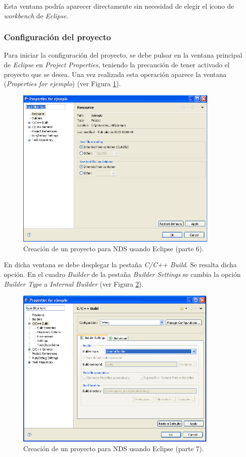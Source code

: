 Esta ventana podría aparecer directamente sin necesidad de elegir el icono de \textit{workbench} de \textit{Eclipse}.

\subsubsection{Configuración del proyecto}
Para iniciar la configuración del proyecto, se debe pulsar en la ventana principal de \textit{Eclipse} en \textit{Project Properties}, teniendo la precaución de tener activado el proyecto que se desea. Una vez realizada esta operación aparece la ventana (\textit{Properties for ejemplo}) (ver Figura \ref{fig_c2_eclipse5}).

\begin{figure}[t]
\centering
\includegraphics[height=8cm]{./Figuras/C2/c2_eclipse5.png}
\caption{Creación de un proyecto para NDS usando Eclipse (parte 6).}
\label{fig_c2_eclipse5}
\end{figure}

En dicha ventana se debe desplegar la pestaña \textit{C/C++ Build}. Se resalta dicha opción. En el cuadro \textit{Builder} de la pestaña \textit{Builder Settings} se cambia la opción \textit{Builder Type} a \textit{Internal Builder} (ver Figura \ref{fig_c2_eclipse6}).

\begin{figure}[t]
	\centering
	\includegraphics[height=8cm]{./Figuras/C2/c2_eclipse6.png}
	\caption{Creación de un proyecto para NDS usando Eclipse (parte 7).}
	\label{fig_c2_eclipse6}
\end{figure}

